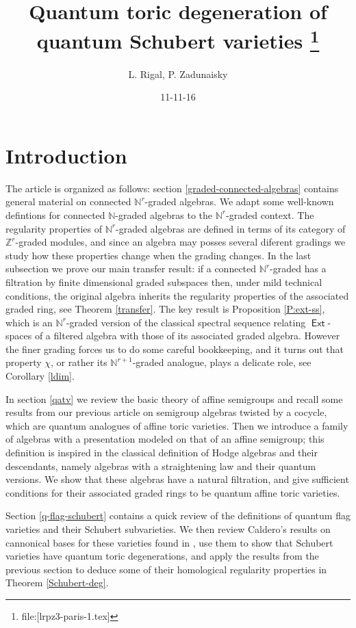 \documentclass[11pt,fleqn]{article}
\title{
Quantum toric degeneration of quantum Schubert varieties
\footnote{file:[lrpz3-paris-1.tex]}
}
\date{11-11-16}
\author{L. Rigal, P. Zadunaisky}
\newcommand\NN{\mathbb N}
\newcommand\ZZ{\mathbb Z}
\DeclareMathOperator\Ext{\mathsf{Ext}}
\begin{document}
\maketitle


\section{Introduction}

The article is organized as follows: section \ref{graded-connected-algebras} 
contains general material on connected $\NN^r$-graded algebras. We adapt some 
well-known defintions for connected $\NN$-graded algebras to the 
$\NN^r$-graded context. The regularity properties of $\NN^r$-graded algebras 
are defined in terms of its category of $\ZZ^r$-graded modules, and since an 
algebra may posses several diferent gradings we study how these properties 
change when the grading changes. In the last subsection we 
prove our main transfer result: if a connected $\NN^r$-graded has a filtration 
by finite dimensional graded subspaces then, under mild technical conditions, 
the original algebra inherits the regularity properties of the associated 
graded ring, see Theorem \ref{transfer}. The key result is Proposition 
\ref{P:ext-ss}, which is an $\NN^r$-graded version of the classical spectral 
sequence relating $\Ext$-spaces of a filtered algebra with those of its 
associated graded algebra. However the finer grading forces us 
to do some careful bookkeeping, and it turns out that property $\chi$, or 
rather its $\NN^{r+1}$-graded analogue, plays a delicate role, see Corollary 
\ref{ldim}.

In section \ref{qatv} we review the basic theory of affine semigroups and 
recall some results from our previous article \cite{RZ2} on semigroup algebras 
twisted by a cocycle, which are quantum analogues of affine toric varieties. 
Then we introduce a family of algebras with a presentation modeled on that of 
an affine semigroup; this definition is inspired in the classical definition 
of Hodge algebras and their descendants, namely algebras with a straightening 
law and their quantum versions. We show that these algebras have a natural 
filtration, and give  sufficient conditions for their associated graded rings 
to be quantum affine toric varieties.

Section \ref{q-flag-schubert} contains a quick review of the definitions of 
quantum flag varieties and their Schubert subvarieties. We then review 
Caldero's results on cannonical bases for these varieties found in \cite{C}, 
use them to show that Schubert varieties have quantum toric degenerations, and 
apply the results from the previous section to deduce some of their 
homological regularity properties in Theorem \ref{Schubert-deg}. 
\end{document}
